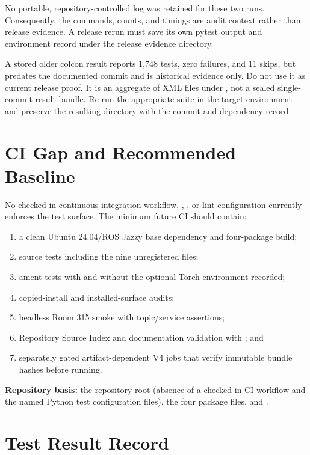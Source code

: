 No portable, repository-controlled log was retained for these two runs.
Consequently, the commands, counts, and timings are audit context rather than
release evidence. A release rerun must save its own pytest output and
environment record under the release evidence directory.

A stored older colcon result reports 1,748 tests, zero failures, and 11 skips,
but predates the documented commit and is historical evidence only. Do not use
it as current release proof. It is an aggregate of XML files under
, not a sealed
single-commit result bundle. Re-run the appropriate suite in the target
environment and preserve the resulting  directory
with the commit and dependency record.

\section{CI Gap and Recommended Baseline}

No checked-in continuous-integration workflow, ,
, or lint configuration currently enforces the test surface.
The minimum future CI should contain:

\begin{enumerate}
  \item a clean Ubuntu 24.04/ROS Jazzy base dependency and four-package build;
  \item source tests including the nine unregistered files;
  \item ament tests with and without the optional Torch environment recorded;
  \item copied-install and installed-surface audits;
  \item headless Room 315 smoke with topic/service assertions;
  \item Repository Source Index and documentation validation with ; and
  \item separately gated artifact-dependent V4 jobs that verify immutable
        bundle hashes before running.
\end{enumerate}

\noindent\textbf{Repository basis:} the repository root (absence of a checked-in
CI workflow and the named Python test configuration files), the four package
 files, and .

\section{Test Result Record}

